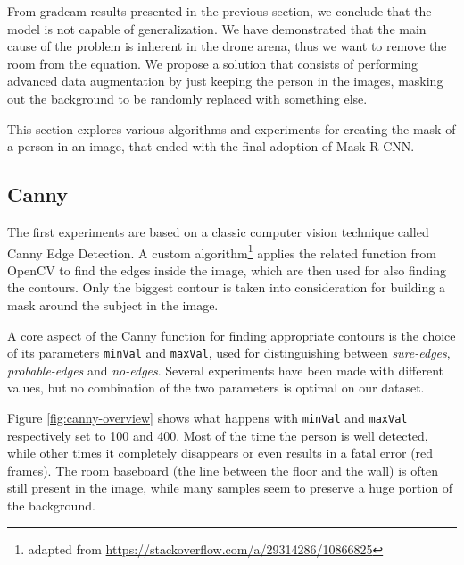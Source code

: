 From \gls{gradcam} results presented in the previous section, we conclude that the model is not capable of generalization. We have demonstrated that the main cause of the problem is inherent in the drone arena, thus we want to remove the room from the equation. We propose a solution that consists of performing advanced data augmentation by just keeping the person in the images, masking out the background to be randomly replaced with something else.

This section explores various algorithms and experiments for creating the mask of a person in an image, that ended with the final adoption of Mask R-CNN.



\subsection{Canny}
\label{subsec:masking-canny}

The first experiments are based on a classic computer vision technique called Canny Edge Detection. A custom algorithm\footnote{adapted from \url{https://stackoverflow.com/a/29314286/10866825}} applies the related function from OpenCV\cite{opencv_canny} to find the edges inside the image, which are then used for also finding the contours. Only the biggest contour is taken into consideration for building a mask around the subject in the image.

\medskip

A core aspect of the Canny function for finding appropriate contours is the choice of its parameters \texttt{minVal} and \texttt{maxVal}, used for distinguishing between \textit{sure-edges}, \textit{probable-edges} and \textit{no-edges}. Several experiments have been made with different values, but no combination of the two parameters is optimal on our dataset.

Figure \ref{fig:canny-overview} shows what happens with \texttt{minVal} and \texttt{maxVal} respectively set to 100 and 400. Most of the time the person is well detected, while other times it completely disappears or even results in a fatal error (red frames). The room baseboard (the line between the floor and the wall) is often still present in the image, while many samples seem to preserve a huge portion of the background.

